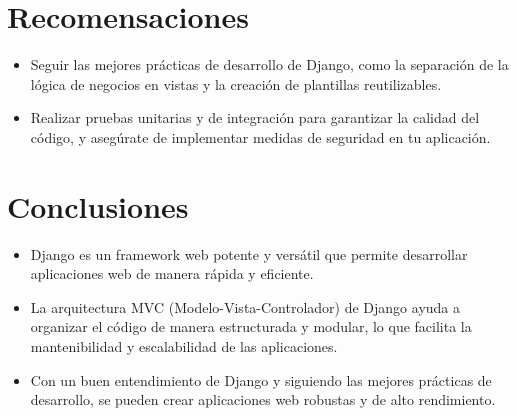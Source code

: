 \documentclass{article}
\begin{document}

  \section{Recomensaciones}
  \begin{itemize}
    \item Seguir las mejores prácticas de desarrollo de Django, como la separación de la lógica de negocios en vistas y 
    la creación de plantillas reutilizables.
    \item Realizar pruebas unitarias y de integración para garantizar la calidad del código, y asegúrate de implementar 
    medidas de seguridad en tu aplicación.
  \end{itemize}


  \section{Conclusiones}
  \begin{itemize}
    \item Django es un framework web potente y versátil que permite desarrollar aplicaciones web de manera rápida y eficiente.
    \item La arquitectura MVC (Modelo-Vista-Controlador) de Django ayuda a organizar el código de manera estructurada y modular, 
    lo que facilita la mantenibilidad y escalabilidad de las aplicaciones.
    \item Con un buen entendimiento de Django y siguiendo las mejores prácticas de desarrollo, se pueden crear aplicaciones web 
    robustas y de alto rendimiento.
  \end{itemize}

	\newpage
\end{document}
